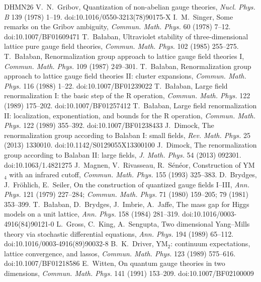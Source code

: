\documentclass[11pt,a4paper]{article}
\begin{document}
\begin{thebibliography}{DHMN26}
 V.~N.~Gribov, Quantization of non-abelian gauge theories, \emph{Nucl. Phys. B} 139 (1978) 1--19. doi:10.1016/0550-3213(78)90175-X
 I.~M.~Singer, Some remarks on the Gribov ambiguity, \emph{Commun. Math. Phys.} 60 (1978) 7--12. doi:10.1007/BF01609471
 T.~Ba{\l}aban, Ultraviolet stability of three-dimensional lattice pure gauge field theories, \emph{Commun. Math. Phys.} 102 (1985) 255--275.
 T.~Ba{\l}aban, Renormalization group approach to lattice gauge field theories I, \emph{Commun. Math. Phys.} 109 (1987) 249--301.
 T.~Ba{\l}aban, Renormalization group approach to lattice gauge field theories II: cluster expansions, \emph{Commun. Math. Phys.} 116 (1988) 1--22. doi:10.1007/BF01239022
 T.~Ba{\l}aban, Large field renormalization I: the basic step of the R operation, \emph{Commun. Math. Phys.} 122 (1989) 175--202. doi:10.1007/BF01257412
 T.~Ba{\l}aban, Large field renormalization II: localization, exponentiation, and bounds for the R operation, \emph{Commun. Math. Phys.} 122 (1989) 355--392. doi:10.1007/BF01238433
 J.~Dimock, The renormalization group according to Balaban I: small fields, \emph{Rev. Math. Phys.} 25 (2013) 1330010. doi:10.1142/S0129055X13300100
 J.~Dimock, The renormalization group according to Balaban II: large fields, \emph{J. Math. Phys.} 54 (2013) 092301. doi:10.1063/1.4821275
 J.~Magnen, V.~Rivasseau, R.~S\'en\'eor, Construction of YM$_4$ with an infrared cutoff, \emph{Commun. Math. Phys.} 155 (1993) 325--383.
 D.~Brydges, J.~Fr\"ohlich, E.~Seiler, On the construction of quantized gauge fields I--III, \emph{Ann. Phys.} 121 (1979) 227--284; \emph{Commun. Math. Phys.} 71 (1980) 159--205; 79 (1981) 353--399.
 T.~Ba{\l}aban, D.~Brydges, J.~Imbrie, A.~Jaffe, The mass gap for Higgs models on a unit lattice, \emph{Ann. Phys.} 158 (1984) 281--319. doi:10.1016/0003-4916(84)90121-0
 L.~Gross, C.~King, A.~Sengupta, Two dimensional Yang--Mills theory via stochastic differential equations, \emph{Ann. Phys.} 194 (1989) 65--112. doi:10.1016/0003-4916(89)90032-8
 B.~K.~Driver, YM$_2$: continuum expectations, lattice convergence, and lassos, \emph{Commun. Math. Phys.} 123 (1989) 575--616. doi:10.1007/BF01218586
 E.~Witten, On quantum gauge theories in two dimensions, \emph{Commun. Math. Phys.} 141 (1991) 153--209. doi:10.1007/BF02100009

\end{thebibliography}
\end{document}
